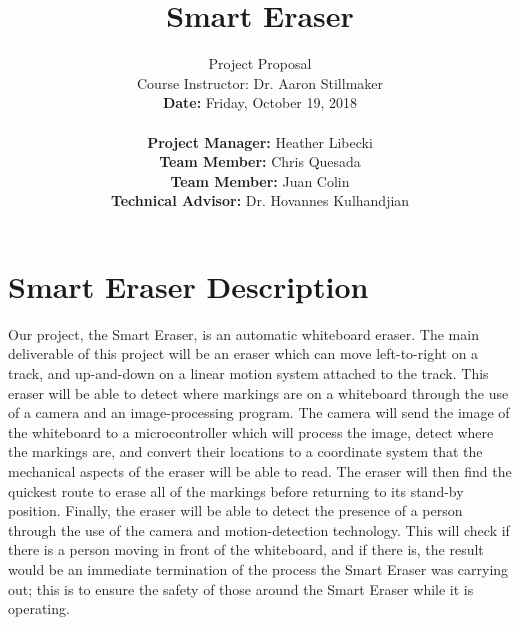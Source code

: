 \documentclass[10pt,onecolumn,draftclsnofoot]{IEEEtran} 					%
\title{\vspace{2in}Smart Eraser}	%
\author{Project Proposal \\ 			%
	Course Instructor: Dr. Aaron Stillmaker \\ 				%
	\vspace{12pt} 								%
	\textbf{Date:} Friday, October 19, 2018  \\ 
	\vspace{2in}								%
	\vspace{6pt}
\begin{flushleft}
	\textbf{Project Manager:} Heather Libecki			%
	\vspace{12pt}
	\underline{\hspace{3.77in}}\\					%
	\textbf{Team Member:} Chris Quesada
	\vspace{12pt}
	\underline{\hspace{4in}}\\
	\textbf{Team Member:} Juan Colin
	\vspace{12pt}
	\underline{\hspace{4.25in}}\\
	\textbf{Technical Advisor:} Dr. Hovannes Kulhandjian
	\underline{\hspace{3.05in}} \\
	\end{flushleft}
	\vspace{12in}}								%
\begin{document}
	\thispagestyle{empty}						%
	
	\maketitle									%
	
	
	\section{Smart Eraser Description}
	\setlength{\parindent}{5ex}
	Our project, the Smart Eraser, is an automatic whiteboard eraser. The main deliverable of this project will be an eraser which can move left-to-right on a track, and up-and-down on a linear motion system attached to the track. This eraser will be able to detect where markings are on a whiteboard through the use of a camera and an image-processing program. The camera will send the image of the whiteboard to a microcontroller which will process the image, detect where the markings are, and convert their locations to a coordinate system that the mechanical aspects of the eraser will be able to read. The eraser will then find the quickest route to erase all of the markings before returning to its stand-by position. Finally, the eraser will be able to detect the presence of a person through the use of the camera and motion-detection technology. This will check if there is a person moving in front of the whiteboard, and if there is, the result would be an immediate termination of the process the Smart Eraser was carrying out; this is to ensure the safety of those around the Smart Eraser while it is operating. 
	
\end{document}
